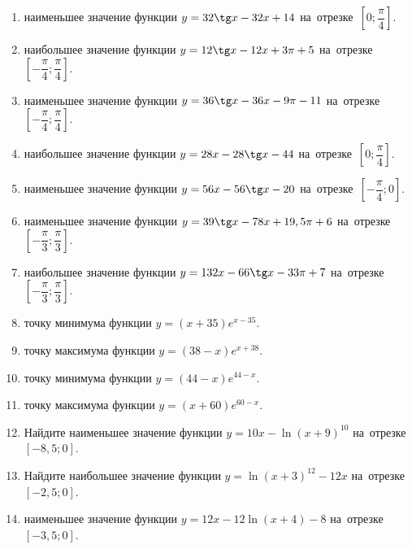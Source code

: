\documentclass[a4paper,10pt]{article}
\begin{document}
\begin{enumerate}
\item {} наименьшее значение функции $y = 32\tg x-32x+14$ на~отрезке~$\left[0;\dfrac{\pi }{4}\right]$.

\item {} наибольшее значение функции $y=12\tg x-12x+3\pi +5$ на~отрезке~$\left[-\dfrac{\pi }{4};\dfrac{\pi }{4}\right]$.

\item {} наименьшее значение функции $y=36\tg x-36x-9\pi -11$ на~отрезке~$\left[-\dfrac{\pi }{4};\dfrac{\pi }{4}\right]$.

\item {} наибольшее значение функции $y = 28x-28\tg x -44$ на~отрезке~$\left[0;\dfrac{\pi }{4}\right]$.

\item {} наименьшее значение функции $y = 56x-56\tg x -20$ на~отрезке~$\left[-\dfrac{\pi }{4};0\right]$.

\item {} наименьшее значение функции $y = 39\tg x-78x+19,5 \pi +6$ на~отрезке~$\left[-\dfrac{\pi }{3};\dfrac{\pi }{3}\right]$.

\item {} наибольшее значение функции $y = 132x-66\tg x-33\pi +7$ на~отрезке~$\left[-\dfrac{\pi }{3};\dfrac{\pi }{3}\right]$.

\item {} точку минимума функции $y = \left(x+35\right)e^{x-35}$.

\item {} точку максимума функции $y = \left(38-x\right)e^{x+38}$.

\item {} точку минимума функции $y = \left(44-x\right)e^{44-x}$.

\item {} точку максимума функции $y = \left(x+60\right)e^{60-x}$.

\item Найдите наименьшее значение функции $y = 10x-\ln \left(x+9\right)^{10}$ на~отрезке~$\left[-8,5;0\right]$.

\item Найдите наибольшее значение функции $y = \ln \left(x+3\right)^{12}-12x$ на~отрезке~$\left[-2,5;0\right]$.

\item {} наименьшее значение функции $y = 12x-12\ln \left(x+4\right) -8$ на~отрезке~$\left[-3,5;0\right]$.


\end{enumerate}
\end{document}
